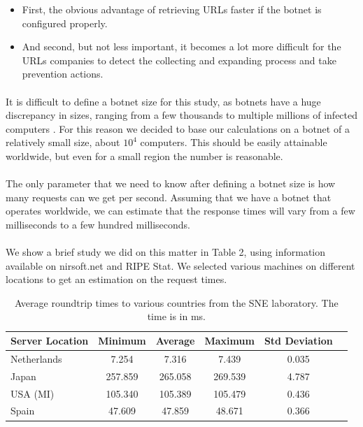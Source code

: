\documentclass[12pt]{article}
\begin{document}
\begin{itemize}

\item  First, the obvious advantage of retrieving URLs faster if the botnet is configured properly.

\item  And second, but not less important, it becomes a lot more difficult for the URLs companies to detect the collecting and expanding process and take prevention actions.

\end{itemize}

\paragraph{}
It is difficult to define a botnet size for this study, as botnets have a huge discrepancy in sizes, ranging from a few thousands to multiple millions of infected computers \cite{bots}. For this reason we decided to base our calculations on a botnet of a relatively small size, about $10^{4}$  computers. This should be easily attainable worldwide, but even for a small region the number is reasonable.

\paragraph{}
The only parameter that we need to know after defining a botnet size is how many requests can we get per second. Assuming that we have a botnet that operates worldwide, we can estimate that the response times will vary from a few milliseconds to a few hundred milliseconds.

\paragraph{}
We show a brief study we did on this matter in Table 2, using information available on nirsoft.net\cite{nirsoft} and RIPE Stat\cite{ripestat}. We selected various machines on different locations to get an estimation on the request times.

\begin{table}[h]
		\begin{tabular}{|l|c|c|c|c|c|}
  			\hline
	  		\textbf{Server Location} & \textbf{Minimum} & \textbf{Average} & \textbf{Maximum} & \textbf{Std Deviation} \\
	  		\hline
  			Netherlands \cite{ripestatnl} & 7.254 & 7.316 & 7.439 & 0.035  \\ 
  			\hline
  			Japan \cite{ripestatjp} & 257.859 & 265.058 & 269.539 & 4.787 \\
	  		\hline
  			USA (MI)  \cite{ripestatus} & 105.340 & 105.389 & 105.479 & 0.436 \\
  			\hline
  			Spain \cite{ripestates}& 47.609 & 47.859 & 48.671 & 0.366 \\
  			\hline
		\end{tabular}
	\caption[A table]{Average roundtrip times to various countries from the SNE laboratory. The time is in ms.}
\end{table}
\end{document}
